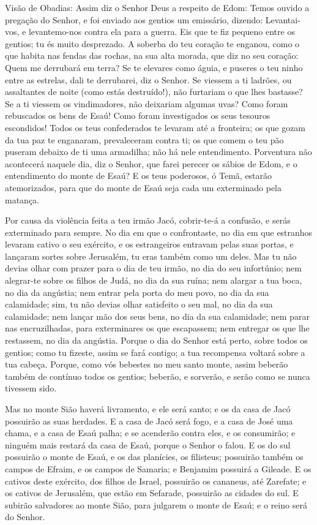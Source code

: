 
Visão de Obadias: Assim diz o Senhor Deus a respeito de Edom:
Temos ouvido a pregação do Senhor, e foi enviado aos gentios um
emissário, dizendo: Levantai-vos, e levantemo-nos contra ela para a
guerra. Eis que te fiz pequeno entre os gentios; tu és muito
desprezado. A soberba do teu coração te enganou, como o que
habita nas fendas das rochas, na sua alta morada, que diz no seu
coração: Quem me derrubará em terra? Se te elevares como águia,
e puseres o teu ninho entre as estrelas, dali te derrubarei, diz o
Senhor. Se viessem a ti ladrões, ou assaltantes de noite (como
estás destruído!), não furtariam o que lhes bastasse? Se a ti
viessem os vindimadores, não deixariam algumas uvas? Como foram
rebuscados os bens de Esaú! Como foram investigados os seus tesouros
escondidos! Todos os teus confederados te levaram até a
fronteira; os que gozam da tua paz te enganaram, prevaleceram contra
ti; os que comem o teu pão puseram debaixo de ti uma armadilha; não
há nele entendimento. Porventura não acontecerá naquele dia, diz
o Senhor, que farei perecer os sábios de Edom, e o entendimento do
monte de Esaú? E os teus poderosos, ó Temã, estarão
atemorizados, para que do monte de Esaú seja cada um exterminado
pela matança.

Por causa da violência feita a teu irmão Jacó, cobrir-te-á a
confusão, e serás exterminado para sempre. No dia em que o
confrontaste, no dia em que estranhos levaram cativo o seu exército,
e os estrangeiros entravam pelas suas portas, e lançaram sortes
sobre Jerusalém, tu eras também como um deles. Mas tu não
devias olhar com prazer para o dia de teu irmão, no dia do seu
infortúnio; nem alegrar-te sobre os filhos de Judá, no dia da sua
ruína; nem alargar a tua boca, no dia da angústia; nem entrar
pela porta do meu povo, no dia da sua calamidade; sim, tu não devias
olhar satisfeito o seu mal, no dia da sua calamidade; nem lançar mão
dos seus bens, no dia da sua calamidade; nem parar nas
encruzilhadas, para exterminares os que escapassem; nem entregar os
que lhe restassem, no dia da angústia. Porque o dia do Senhor
está perto, sobre todos os gentios; como tu fizeste, assim se fará
contigo; a tua recompensa voltará sobre a tua cabeça. Porque,
como vós bebestes no meu santo monte, assim beberão também de
contínuo todos os gentios; beberão, e sorverão, e serão como se
nunca tivessem sido.

Mas no monte Sião haverá livramento, e ele será santo; e os da
casa de Jacó possuirão as suas herdades. E a casa de Jacó
será fogo, e a casa de José uma chama, e a casa de Esaú palha; e se
acenderão contra eles, e os consumirão; e ninguém mais restará da
casa de Esaú, porque o Senhor o falou. E os do sul possuirão
o monte de Esaú, e os das planícies, os filisteus; possuirão também
os campos de Efraim, e os campos de Samaria; e Benjamim possuirá a
Gileade. E os cativos deste exército, dos filhos de Israel,
possuirão os cananeus, até Zarefate; e os cativos de Jerusalém, que
estão em Sefarade, possuirão as cidades do sul. E subirão
salvadores ao monte Sião, para julgarem o monte de Esaú; e o reino
será do Senhor.
